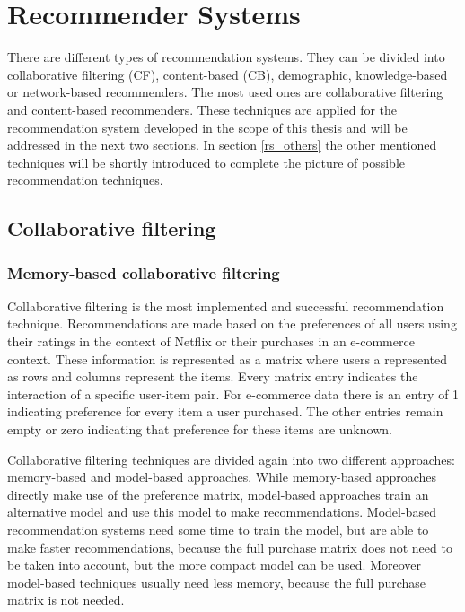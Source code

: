 \documentclass[10pt]{reportMaster}
\begin{document}
\chapter{Recommender Systems}
There are different types of recommendation systems.
They can be divided into collaborative filtering (CF), content-based (CB), demographic, knowledge-based or network-based recommenders. %
The most used ones are collaborative filtering and content-based recommenders.
These techniques are applied for the recommendation system developed in the scope of this thesis and will be addressed in the next two sections.
In section \ref{rs_others} the other mentioned techniques will be shortly introduced to complete the picture of possible recommendation techniques.

\section{Collaborative filtering}
\label{rs_cf}
\subsection{Memory-based collaborative filtering}
Collaborative filtering is the most implemented and successful recommendation technique. %
Recommendations are made based on the preferences of all users using their ratings in the context of Netflix or their purchases in an e-commerce context.
These information is represented as a matrix where users a represented as rows and columns represent the items.
Every matrix entry indicates the interaction of a specific user-item pair.
For e-commerce data there is an entry of 1 indicating preference for every item a user purchased.
The other entries remain empty or zero indicating that preference for these items are unknown. %

Collaborative filtering techniques are divided again into two different approaches: memory-based and model-based approaches.
While memory-based approaches directly make use of the preference matrix, model-based approaches train an alternative model and use this model to make recommendations.
Model-based recommendation systems need some time to train the model, but are able to make faster recommendations, because the full purchase matrix does not need to be taken into account, but the more compact model can be used.
Moreover model-based techniques usually need less memory, because the full purchase matrix is not needed.
\end{document}
